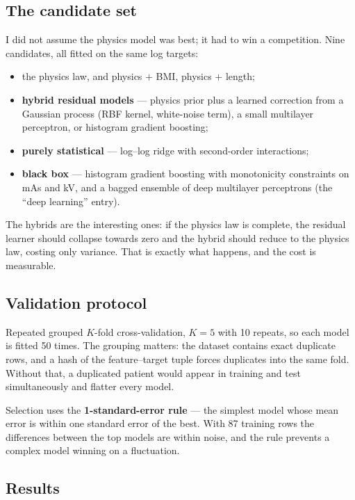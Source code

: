 \documentclass[10pt,a4paper,twocolumn]{article}
\begin{document}
\subsection{The candidate set}

I did not assume the physics model was best; it had to win a competition. Nine candidates, all fitted on the
same log targets:

\begin{itemize}
\item the physics law, and physics $+$ BMI, physics $+$ length;
\item \textbf{hybrid residual models} — physics prior plus a learned correction from a Gaussian process
(RBF kernel, white-noise term), a small multilayer perceptron, or histogram gradient boosting;
\item \textbf{purely statistical} — log--log ridge with second-order interactions;
\item \textbf{black box} — histogram gradient boosting with monotonicity constraints on mAs and kV, and a bagged
ensemble of deep multilayer perceptrons (the ``deep learning'' entry).
\end{itemize}

The hybrids are the interesting ones: if the physics law is complete, the residual learner should collapse
towards zero and the hybrid should reduce to the physics law, costing only variance. That is exactly what
happens, and the cost is measurable.

\subsection{Validation protocol}

Repeated grouped $K$-fold cross-validation, $K=5$ with 10 repeats, so each model is fitted 50 times. The
grouping matters: the dataset contains exact duplicate rows, and a hash of the feature--target tuple forces
duplicates into the same fold. Without that, a duplicated patient would appear in training and test
simultaneously and flatter every model.

Selection uses the \textbf{1-standard-error rule} — the simplest model whose mean error is within one standard
error of the best. With 87 training rows the differences between the top models are within noise, and the rule
prevents a complex model winning on a fluctuation.

\subsection{Results}
\end{document}
